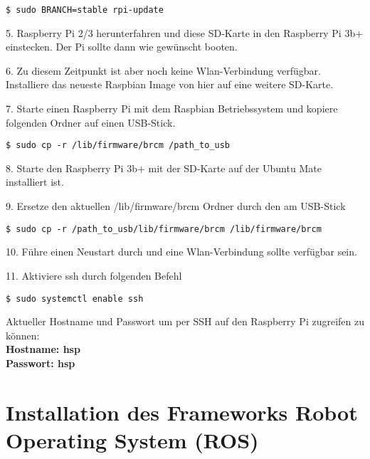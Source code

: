 \begin{lstlisting}
$ sudo BRANCH=stable rpi-update
\end{lstlisting}
\vspace{-0.8cm}

5. Raspberry Pi 2/3 herunterfahren und diese SD-Karte in den Raspberry Pi 3b+ einstecken. Der Pi sollte dann wie gewünscht booten. 

6. Zu diesem Zeitpunkt ist aber noch keine Wlan-Verbindung verfügbar. Installiere das neueste Raspbian Image von hier auf eine weitere SD-Karte. 

7. Starte einen Raspberry Pi mit dem Raspbian Betriebssystem und kopiere folgenden Ordner auf einen USB-Stick.\\

\begin{lstlisting}
$ sudo cp -r /lib/firmware/brcm /path_to_usb
\end{lstlisting}
\vspace{-0.8cm}

8. Starte den Raspberry Pi 3b+ mit der SD-Karte auf der Ubuntu Mate installiert ist. 

9. Ersetze den aktuellen /lib/firmware/brcm Ordner durch den am USB-Stick\\

\begin{lstlisting}
$ sudo cp -r /path_to_usb/lib/firmware/brcm /lib/firmware/brcm
\end{lstlisting}
\vspace{-0.8cm}

10. Führe einen Neustart durch und eine Wlan-Verbindung sollte verfügbar sein.

11. Aktiviere ssh durch folgenden Befehl\\

\begin{lstlisting}
$ sudo systemctl enable ssh
\end{lstlisting}


Aktueller Hostname und Passwort um per SSH auf den Raspberry Pi zugreifen zu können:\\
\textbf{Hostname: hsp}\\
\textbf{Passwort: hsp}







\section{Installation des Frameworks Robot Operating System (ROS)}

